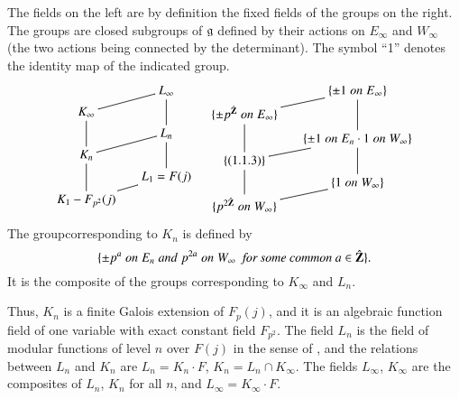 \begin{definitions*}
The fields on the left are by definition the fixed fields of the groups on the right. The groups are closed subgroups of $\mathfrak{g}$ defined by their actions on $E_\infty$ and $W_\infty$ (the two actions being connected by the determinant). The symbol ``1'' denotes the identity map of the indicated group.
$$
\xymatrix@R=0.1cm@C=0.5cm{
& L_\infty \ar@{-}[dd]\\
K_\infty \ar@{-}[ur] \ar@{-}[dd]& \\
& L_n \ar@{-}[dd] \\
K_n \ar@{-}[ur] \ar@{-}[dd]&\\
& L_1 = F(j)\\
K_1 - F_{p^2} (j) \ar@{-}[ur]& 
}
\quad
\xymatrix@R=0.1cm@C=0.5cm{
& \{ \pm 1 \; on\; E_\infty \} \ar@{-}[dd]\\
\{\pm p^{\hat{\bZ}} \;on\; E_\infty\}\ar@{-}[ur] \ar@{-}[dd]& \\
& \{\pm 1 \;on\; E_n \cdot 1 \; on \; W_\infty\} \ar@{-}[dd] \\
\{(1.1.3)\}  \ar@{-}[ur] \ar@{-}[dd]&\\
& \{1 \; on \; W_\infty \}\\
\{p^{2 \hat{\bZ}} \; on \; W_\infty\}  \ar@{-}[ur]& 
}
$$
The group\pageoriginale corresponding to $K_n$ is defined by 
\setcounter{equation}{2} 
\begin{equation}
\{\pm p^a \; on \; E_n \; and \; p^{2a} \;on\; W_\infty \textit{\; for some common } a \in \hat{\mathbf{Z}}\}. \label{art6-eq1.1.3}
\end{equation}
It is the composite of the groups corresponding to $K_\infty$ and $L_n$. 

Thus, $K_n$ is a finite Galois extension of $F_p(j)$, and it is an algebraic function field of one variable with exact constant field $F_{p^2}$. The field $L_n$ is the field of modular functions of level $n$ over $F(j)$ in the sense of \cite{art6-key5}, and the relations between $L_n$ and $K_n$ are $L_n = K_n \cdot F$, $K_n = L_n \cap K_\infty$. The fields $L_\infty$, $K_\infty$ are the composites of $L_n $, $K_n$ for all $n$, and $L_\infty = K_\infty \cdot F$.


\end{definitions*}
